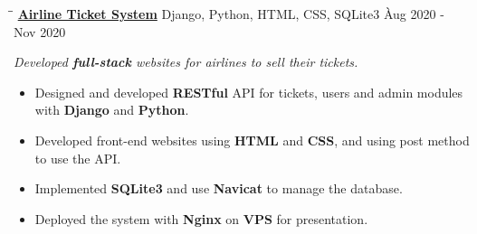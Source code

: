 \documentclass{res}
\begin{document}
\begin{resume}
    \vspace{-0.2in}	 
    \begin{tabbing}
    \hspace{2.391in}\= \hspace{3in}\= \kill %
    \href{https://github.com/DolorHunter/AirlineTicketSystem}{\bf Airline Ticket System}  \> 
                Django, Python, HTML, CSS, SQLite3 \` Aug 2020 - Nov 2020 \\
    \end{tabbing}\vspace{-20pt}      %
    \vspace{-0.13in}
    \textit{Developed {\bf full-stack} websites for airlines to sell their tickets.}
    \vspace{+0.05in}
    \begin{itemize} \itemsep 0.5pt %
        \item Designed and developed {\bf RESTful} API for tickets, users and admin modules with 
                {\bf Django} and {\bf Python}.
        \item Developed front-end websites using {\bf HTML} and {\bf CSS}, and using post method 
                to use the API.
        \item Implemented {\bf SQLite3} and use {\bf Navicat} to manage the database.
        \item Deployed the system with {\bf Nginx} on {\bf VPS} for presentation.
    \end{itemize}


\end{resume}
\end{document}
